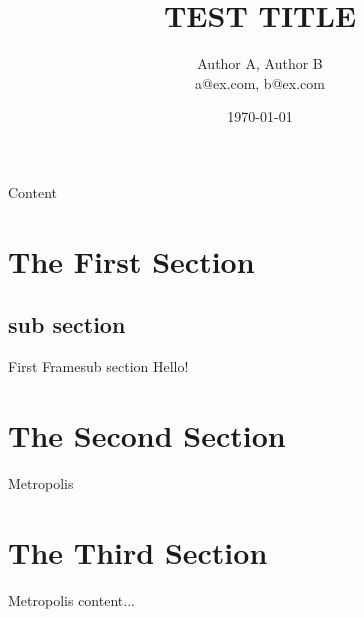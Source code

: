 \documentclass{beamer}
\title{TEST TITLE}
\date{\today}
\author[Author A and Author B]
{Author A, Author B\\
    {\ttfamily a@ex.com, b@ex.com}}
\institute{Centre for Modern Beamer Themes}
\begin{document}
    \maketitle
    
    \begin{frame}{Content}{}
        \tableofcontents
    \end{frame}
    
    \section{The First Section}
    \subsection{sub section}
    \begin{frame}{First Frame}{sub section}
        Hello!
    \end{frame}
    
    \section{The Second Section}
    
    \begin{frame}{Metropolis}
        
    \end{frame}
    
    \section{The Third Section}
    
    \begin{frame}{Metropolis}
        content...
    \end{frame}
    
\end{document}
